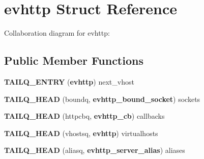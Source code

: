 \section{evhttp \-Struct \-Reference}
\label{structevhttp}


\-Collaboration diagram for evhttp\-:
\subsection*{\-Public \-Member \-Functions}
\begin{DoxyCompactItemize}
\item 
{\bfseries \-T\-A\-I\-L\-Q\-\_\-\-E\-N\-T\-R\-Y} ({\bf evhttp}) next\-\_\-vhost\label{structevhttp_ac1c8501b3b24f51ef1a6f9b16fdde6e2}

\item 
{\bfseries \-T\-A\-I\-L\-Q\-\_\-\-H\-E\-A\-D} (boundq, {\bf evhttp\-\_\-bound\-\_\-socket}) sockets\label{structevhttp_a5fa91f2f563a39d4a23060ebb505b2e6}

\item 
{\bfseries \-T\-A\-I\-L\-Q\-\_\-\-H\-E\-A\-D} (httpcbq, {\bf evhttp\-\_\-cb}) callbacks\label{structevhttp_a408e7fa8a40916bd165445f6ed68499b}

\item 
{\bfseries \-T\-A\-I\-L\-Q\-\_\-\-H\-E\-A\-D} (vhostsq, {\bf evhttp}) virtualhosts\label{structevhttp_aa1027e07b9d756df82bd0c293d17accc}

\item 
{\bfseries \-T\-A\-I\-L\-Q\-\_\-\-H\-E\-A\-D} (aliasq, {\bf evhttp\-\_\-server\-\_\-alias}) aliases\label{structevhttp_a354c990e507eacccc05935889efba766}

\end{DoxyCompactItemize}
